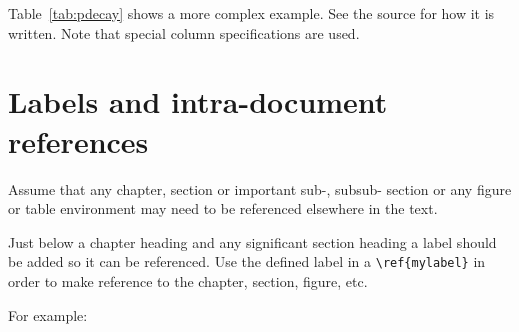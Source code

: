 Table~\ref{tab:pdecay} shows a more complex example.
See the source for how it is written.
Note that special column specifications are used.


\FloatBarrier



\section{Labels and intra-document references}
\label{sec:latex-intra-doc-ref}

Assume that any chapter, section or important sub-, subsub- section
or any figure or table environment may need to be referenced
elsewhere in the text. 

Just below a chapter heading and any significant section heading a
label should be added so it can be referenced. Use the defined label in a \verb|\ref{mylabel}| in order to make reference
to the chapter, section, figure, etc.

For example:

